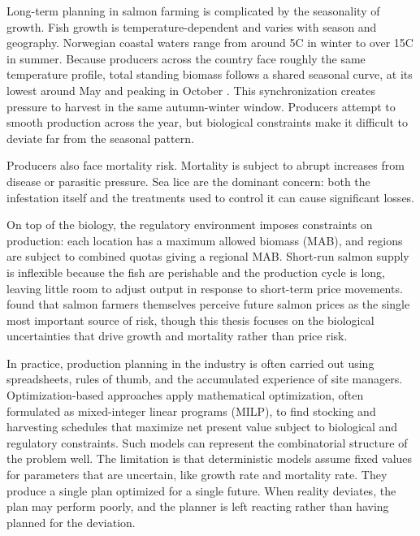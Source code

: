 \documentclass[12pt,a4paper]{article}
\begin{document}
Long-term planning in salmon farming is complicated by the seasonality of growth. Fish growth is temperature-dependent and varies with season and geography. Norwegian coastal waters range from around 5\textdegree C in winter to over 15\textdegree C in summer. Because producers across the country face roughly the same temperature profile, total standing biomass follows a shared seasonal curve, at its lowest around May and peaking in October \citep{mowi2025}. This synchronization creates pressure to harvest in the same autumn-winter window. Producers attempt to smooth production across the year, but biological constraints make it difficult to deviate far from the seasonal pattern.
 
Producers also face mortality risk. Mortality is subject to abrupt increases from disease or parasitic pressure. Sea lice are the dominant concern: both the infestation itself and the treatments used to control it can cause significant losses.
 
On top of the biology, the regulatory environment imposes constraints on production: each location has a maximum allowed biomass (MAB), and regions are subject to combined quotas giving a regional MAB. Short-run salmon supply is inflexible because the fish are perishable and the production cycle is long, leaving little room to adjust output in response to short-term price movements. \citet{bergfjord2009} found that salmon farmers themselves perceive future salmon prices as the single most important source of risk, though this thesis focuses on the biological uncertainties that drive growth and mortality rather than price risk.
 
In practice, production planning in the industry is often carried out using spreadsheets, rules of thumb, and the accumulated experience of site managers. Optimization-based approaches apply mathematical optimization, often formulated as mixed-integer linear programs (MILP), to find stocking and harvesting schedules that maximize net present value subject to biological and regulatory constraints. Such models can represent the combinatorial structure of the problem well. The limitation is that deterministic models assume fixed values for parameters that are uncertain, like growth rate and mortality rate. They produce a single plan optimized for a single future. When reality deviates, the plan may perform poorly, and the planner is left reacting rather than having planned for the deviation.
 
\end{document}
